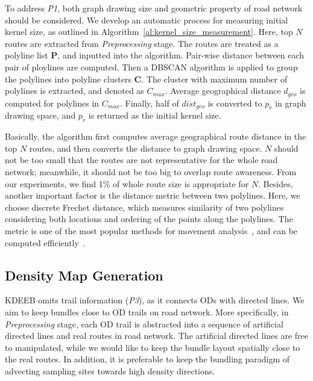 To address \textit{P1}, both graph drawing size and geometric property of road network should be considered.
We develop an automatic process for measuring initial kernel size, as outlined in Algorithm~\ref{al:kernel_size_measurement}.
Here, top $N$ routes are extracted from \textit{Preprocessing} stage.
The routes are treated as a polyline list \textbf{P}, and inputted into the algorithm.
Pair-wise distance between each pair of ploylines are computed. 
Then a DBSCAN algorithm is applied to group the polylines into polyline clusters \textbf{C}.
The cluster with maximum number of polylines is extracted, and denoted as $C_{max}$.
Average geographical distance $d_{geo}$ is computed for polylines in $C_{max}$.
Finally, half of $dist_{geo}$ is converted to $p_r$ in graph drawing space, and $p_r$ is returned as the initial kernel size.

Basically, the algorithm first computes average geographical route distance in the top $N$ routes, and then converts the distance to graph drawing space.
$N$ should not be too small that the routes are not representative for the whole road network; meanwhile, it should not be too big to overlap route awareness.
From our experiments, we find 1\% of whole route size is appropriate for $N$.
Besides, another important factor is the distance metric between two polylines.
Here, we choose discrete Frechet distance, which measures similarity of two polylines considering both locations and ordering of the points along the polylines.
The metric is one of the most popular methods for movement analysis~\cite{gudmundsson2011computational}, and can be computed efficiently~\cite{eiter_1994_computing}.

\subsection{Density Map Generation}
KDEEB omits trail information (\textit{P3}), as it connects ODs with directed lines.
We aim to keep bundles close to OD trails on road network.
More specifically, in \textit{Preprocessing} stage, each OD trail is abstracted into a sequence of artificial directed lines and real routes in road network.
The artificial directed lines are free to manipulated, while we would like to keep the bundle layout spatially close to the real routes.
In addition, it is preferable to keep the bundling paradigm of advecting sampling sites towards high density directions.

